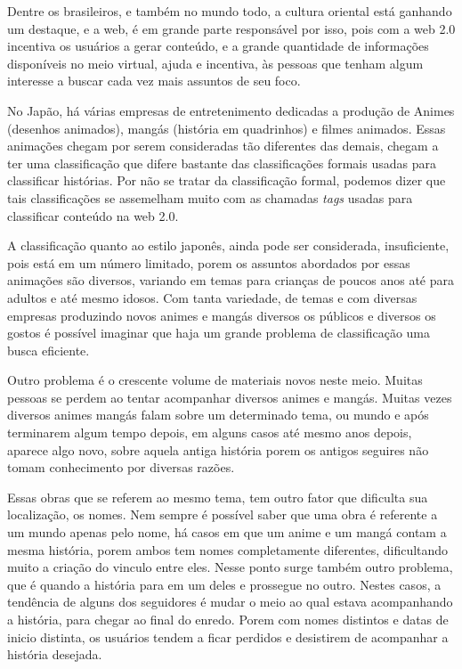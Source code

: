 \documentclass[
	12pt,				%
	openright,			%
	twoside,			%
	a4paper,			%
	Times,
	brazil,				%
	]{abntex2}
\begin{document}
Dentre os brasileiros, e também no mundo todo, a cultura oriental está ganhando um destaque, e a web, é em grande parte responsável por isso, pois com a web 2.0 incentiva os usuários a gerar conteúdo, e a grande quantidade de informações disponíveis no meio virtual, ajuda e incentiva, às pessoas que tenham algum interesse a buscar cada vez mais assuntos de seu foco.
\par

No Japão, há várias empresas de entretenimento dedicadas a produção de Animes (desenhos animados), mangás (história em quadrinhos) e filmes animados. Essas animações chegam por serem consideradas tão diferentes das demais, chegam a ter uma classificação que difere bastante das classificações formais usadas para classificar histórias. Por não se tratar da classificação formal, podemos dizer que tais classificações se assemelham muito com as chamadas \textit{tags} usadas para classificar conteúdo na web 2.0.
\par

A classificação quanto ao estilo japonês, ainda pode ser considerada, insuficiente, pois está em um número limitado, porem os assuntos abordados por essas animações são diversos, variando em temas para crianças de poucos anos até para adultos e até mesmo idosos. Com tanta variedade, de temas e com diversas empresas produzindo novos animes e mangás diversos os públicos e diversos os gostos é possível imaginar que haja um grande problema de classificação uma busca eficiente.
\par

Outro problema é o crescente volume de materiais novos neste meio. Muitas pessoas se perdem ao tentar acompanhar diversos animes e mangás. Muitas vezes diversos animes  mangás falam sobre um determinado tema, ou mundo e após terminarem algum tempo depois, em alguns casos até mesmo anos depois, aparece algo novo, sobre aquela antiga história porem os antigos seguires não tomam conhecimento por diversas razões.
\par

Essas obras que se referem ao mesmo tema, tem outro fator que dificulta sua localização, os nomes. Nem sempre é possível saber que uma obra é referente a um mundo apenas pelo nome, há casos em que um anime e um mangá contam a mesma história, porem ambos tem nomes completamente diferentes, dificultando muito a criação do vinculo entre eles. Nesse ponto surge também outro problema, que é quando a história para em um deles e prossegue no outro. Nestes casos, a tendência de alguns dos seguidores é mudar o meio ao qual estava acompanhando a história, para chegar ao final do enredo. Porem com nomes distintos e datas de inicio distinta, os usuários tendem a ficar perdidos e desistirem de acompanhar a história desejada.
\par
\end{document}

